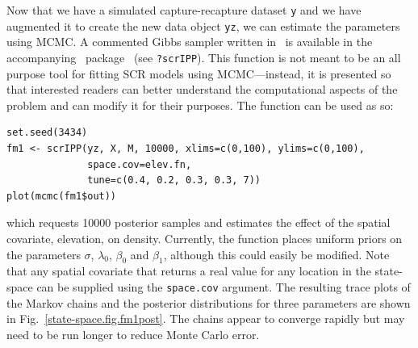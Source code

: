 Now that we have a simulated capture-recapture dataset \texttt{y} and we have
augmented it to create the new data object \texttt{yz}, we can
estimate the parameters using MCMC.  A commented Gibbs sampler written
in \R~is available in the accompanying \R~package \scrbook~(see
\texttt{?scrIPP}). This function is not meant to be an all purpose
tool for fitting SCR models using MCMC---instead, it is presented so
that interested readers can better understand the computational
aspects of the problem and can modify it for their purposes.
The function can be used as so:
\begin{samepage}
  \begin{small}
\begin{verbatim}
set.seed(3434)
fm1 <- scrIPP(yz, X, M, 10000, xlims=c(0,100), ylims=c(0,100),
              space.cov=elev.fn,
              tune=c(0.4, 0.2, 0.3, 0.3, 7))
plot(mcmc(fm1$out))
\end{verbatim}
  \end{small}
\end{samepage}
which requests 10000 posterior samples and estimates the effect of the
spatial covariate, elevation, on density. Currently, the function
places uniform priors on the parameters $\sigma$, $\lambda_0$,
$\beta_0$ and $\beta_1$, although this could easily be modified. Note that any spatial
covariate that returns a real value for any location in the
state-space can be supplied using the \texttt{space.cov} argument. The resulting
trace plots of the Markov chains and the posterior distributions for
three parameters are
shown in Fig.~\ref{state-space.fig.fm1post}. The chains appear to
converge rapidly but may need to be run longer to reduce Monte Carlo
error.

